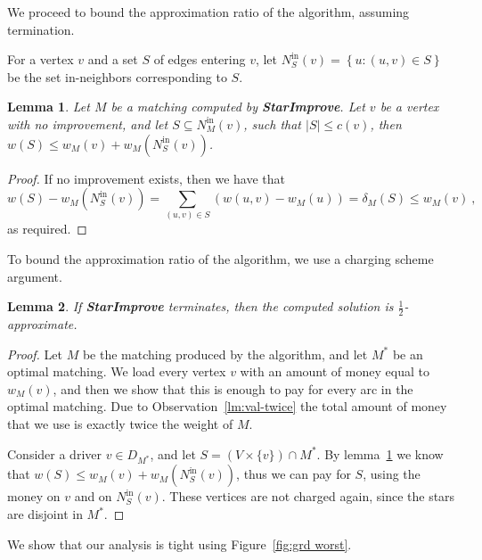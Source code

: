 \documentclass[11pt]{article}
\newtheorem{lemma}{Lemma}
\newcommand{\set}[1]{\left\{ #1 \right\}}
\newcommand{\abs}[1]{\left| #1 \right|}
\newcommand{\half}{\frac{1}{2}}
\newcommand{\nin}[1][M]{N^{\text{in}}_{#1}}
\begin{document}
We proceed to bound the approximation ratio of the algorithm, assuming
termination.

For a vertex $v$ and a set $S$ of edges entering $v$, let $\nin[S](v)
= \set{u : (u,v) \in S}$ be the set in-neighbors corresponding to $S$.

\begin{lemma}
\label{lm:no improve}
Let $M$ be a matching computed by \textbf{StarImprove}.  Let $v$ be a
vertex with no improvement, and let $S \subseteq \nin(v)$, such that
$\abs{S} \leq c(v)$, then $w(S) \leq w_M(v) + w_M(\nin[S](v))$.
\end{lemma}
\begin{proof}
If no improvement exists, then we have that 
\[
w(S) - w_M(\nin[S](v))
=    \sum_{(u,v) \in S} (w(u,v) - w_M(u))
=    \delta_M(S) 
\leq w_M(v)
~,
\]
as required.
\end{proof}

To bound the approximation ratio of the algorithm, we use a charging
scheme argument.

\begin{lemma}
If \textbf{StarImprove} terminates, then the computed solution is
$\half$-approximate.
\end{lemma}
\begin{proof}
Let $M$ be the matching produced by the algorithm, and let $M^*$ be an
optimal matching.  We load every vertex $v$ with an amount of money
equal to $w_M(v)$, and then we show that this is enough to pay for
every arc in the optimal matching.  Due to
Observation~\ref{lm:val-twice} the total amount of money that we use
is exactly twice the weight of $M$.

Consider a driver $v \in D_{M^*}$, and let $S = (V \times \{v\}) \cap
M^*$.  By lemma~\ref{lm:no improve} we know that $w(S) \leq w_M(v) +
w_M(\nin[S](v))$, thus we can pay for $S$, using the money on $v$ and
on $\nin[S](v)$.  These vertices are not charged again, since the
stars are disjoint in $M^*$.
\end{proof}

We show that our analysis is tight using Figure~\ref{fig:grd worst}.
\end{document}
